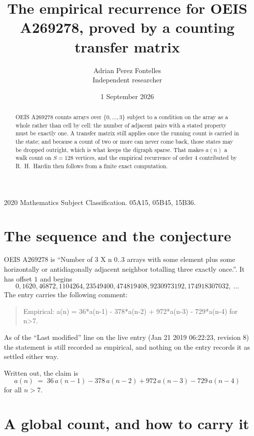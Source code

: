 \documentclass[11pt,a4paper]{article}
\title{The empirical recurrence for OEIS A269278, proved by a counting transfer matrix}
\author{Adrian Perez Fontelles\\ \small Independent researcher}
\date{1 September 2026}
\theoremstyle{plain}
\theoremstyle{definition}
\begin{document}
\maketitle

\begin{abstract}
OEIS A269278 counts arrays over $\{0,\dots,3\}$ subject to a condition on the array as a
whole rather than cell by cell: the number of adjacent pairs with a stated property must be
exactly one. A transfer matrix still applies once the running count is carried in the state; and
because a count of two or more can never come back, those states may be dropped outright,
which is what keeps the digraph sparse. That makes $a(n)$ a walk count on $S=128$ vertices,
and the empirical recurrence of order $4$ contributed by R.~H.~Hardin then follows from
a finite exact computation.
\end{abstract}

\noindent\small 2020 Mathematics Subject Classification. 05A15, 05B45, 15B36.\normalsize

\section{The sequence and the conjecture}

OEIS A269278 is ``Number of 3 X n 0..3 arrays with some element plus some horizontally or antidiagonally adjacent neighbor totalling three exactly once.''. It has offset $1$ and begins
\[
0, 1620, 46872, 1104264, 23549400, 474819408, 9230973192, 174918307032,\ \dots
\]
The entry carries the following comment:
\begin{quote}\small
Empirical: a(n) = 36*a(n-1) - 378*a(n-2) + 972*a(n-3) - 729*a(n-4) for n>7.
\end{quote}
As of the ``Last modified'' line on the live entry (Jan 21 2019 06:22:23, revision 8) the statement is
still recorded as empirical, and nothing on the entry records it as settled either way.

Written out, the claim is
\begin{equation}\label{eq:conj}
a(n)\;=\;36\,a(n-1) - 378\,a(n-2) + 972\,a(n-3) - 729\,a(n-4)
\end{equation}
for all $n>7$.

\section{A global count, and how to carry it}
\end{document}
